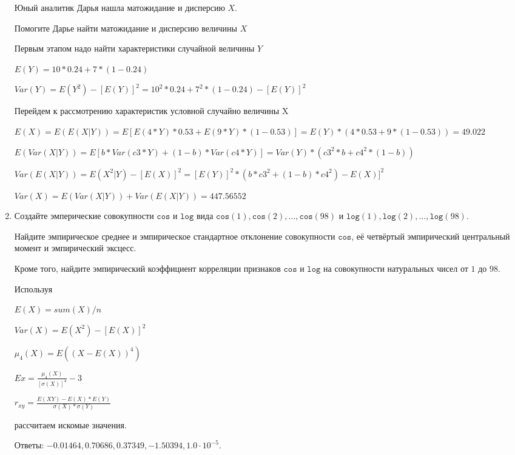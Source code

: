 \documentclass[a4paper,12pt]{article}
\begin{document}
\begin{enumerate}
	Юный аналитик Дарья нашла матожидание и дисперсию $X$.

	Помогите Дарье найти матожидание и дисперсию величины $X$
	


	

	Первым этапом надо найти характеристики случайной величины $Y$

	$E(Y) = 10 * 0.24 + 7 * (1 - 0.24)$

	$Var(Y) = E(Y^2) - [E(Y)]^2 = 10^2 * 0.24 + 7^2 * (1 - 0.24) - [E(Y)]^2$


	Перейдем к рассмотрению характеристик условной случайно величины X

	$E(X) = E(E(X|Y)) = E[E(4 * Y) * 0.53 + E(9 * Y) * (1 - 0.53)] = E(Y) * (4 * 0.53 + 9 * (1 - 0.53)) = 49.022$

	$E(Var(X|Y)) = E[b * Var(c3 * Y) + (1 - b) * Var(c4 * Y)] = Var(Y) * (c3^2 * b + c4^2 * (1- b)) $

	$Var(E(X|Y)) = E(X^2|Y) - [E(X)]^2 = [E(Y)]^2 * (b * c3^2 + (1-b)*c4^2) - E(X)]^2$

	$Var(X) = E(Var(X|Y)) + Var(E(X|Y)) = 447.56552$
	

\item

    
    Создайте эмперические совокупности  $\mathtt{\text{cos}}$ и $\mathtt{\text{log}}$ вида $\mathtt{\text{cos}}(1),\mathtt{\text{cos}}(2), ..., \mathtt{\text{cos}}(98) $ и $\mathtt{\text{log}}(1),\mathtt{\text{log}}(2), ..., \mathtt{\text{log}}(98). $

    Найдите эмпирическое среднее и эмпирическое стандартное отклонение совокупности $\mathtt{\text{cos}}$, её четвёртый эмпирический центральный момент и эмпирический эксцесс.

    Кроме того, найдите эмпирический коэффициент корреляции признаков $\mathtt{\text{cos}}$ и $\mathtt{\text{log}}$ на совокупности натуральных чисел от $1$ до $98$.
    


    
    Используя

	$E(X) = sum(X) / n$

	$Var(X) = E(X^2) - [E(X)]^2$

	$\mu_4(X) = E((X-E(X))^4)$

	$Ex = \frac{\mu_4(X)}{[\sigma(X)]^4} - 3$

	$r_{xy} = \frac{E(XY) - E(X) * E(Y)}{\sigma(X) * \sigma(Y)}$

    рассчитаем искомые значения.

    Ответы: $-0.01464, 0.70686, 0.37349, -1.50394, 1.0 \cdot 10^{-5}$.


\end{enumerate}
\end{document}
